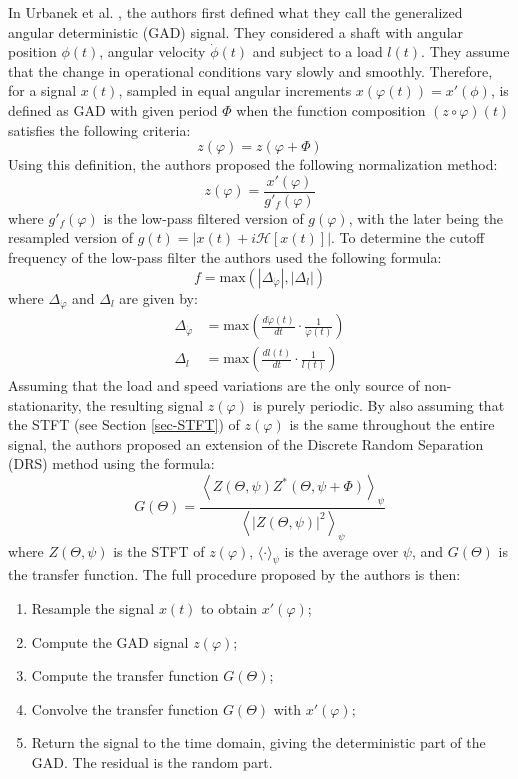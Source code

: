 In Urbanek et al. \cite{URBANEK201713}, the authors first defined what they call the generalized angular deterministic (GAD) signal. They considered a shaft with angular position $\phi(t)$, angular velocity $\dot{\phi}(t)$ and subject to a load $l(t)$. They assume that the change in operational conditions vary slowly and smoothly. Therefore, for a signal $x(t)$, sampled in equal angular increments $x(\varphi(t)) = x'(\phi)$, is defined as GAD with given period $\Phi$ when the function composition $(z \circ \varphi)(t)$ satisfies the following criteria:
\begin{equation}
    z(\varphi) = z(\varphi + \Phi)
\end{equation}
Using this definition, the authors proposed the following normalization method:
\begin{equation}
    z(\varphi) = \frac{x'(\varphi)}{g'_f(\varphi)}
\end{equation}
where $g'_f(\varphi)$ is the low-pass filtered version of $g(\varphi)$, with the later being the resampled version of $g(t) = |x(t)+i\mathcal{H}[x(t)]|$. To determine the cutoff frequency of the low-pass filter the authors used the following formula:
\begin{equation}
    f = \text{max}\left(|\Delta_{\dot{\varphi}}|, |\Delta_{l}|\right)
\end{equation}
where $\Delta_{\dot{\varphi}}$ and $\Delta_{l}$ are given by:
\begin{align}
    \Delta_{\dot{\varphi}} &= \text{max}\left(\frac{d\dot{\varphi}(t)}{dt} \cdot \frac{1}{\dot{\varphi}(t)}\right) \\
    \Delta_{l} &= \text{max}\left(\frac{dl(t)}{dt} \cdot \frac{1}{l(t)}\right)
\end{align}
Assuming that the load and speed variations are the only source of non-stationarity, the resulting signal $z(\varphi)$ is purely periodic. By also assuming that the STFT (see Section \ref{sec-STFT}) of $z(\varphi)$ is the same throughout the entire signal, the authors proposed an extension of the Discrete Random Separation (DRS) \cite{ANTONI20051166} method using the formula:
\begin{equation}
    G(\Theta) = \frac{\left \langle Z(\Theta, \psi)Z^*(\Theta, \psi + \Phi) \right \rangle_\psi}{\left \langle |Z(\Theta, \psi)|^2 \right \rangle_\psi}
\end{equation}
where $Z(\Theta, \psi)$ is the STFT of $z(\varphi)$, $\langle \cdot \rangle_\psi$ is the average over $\psi$, and $G(\Theta)$ is the transfer function. The full procedure proposed by the authors is then:
\begin{enumerate}
    \item Resample the signal $x(t)$ to obtain $x'(\varphi)$;
    \item Compute the GAD signal $z(\varphi)$;
    \item Compute the transfer function $G(\Theta)$;
    \item Convolve the transfer function $G(\Theta)$ with $x'(\varphi)$;
    \item Return the signal to the time domain, giving the deterministic part of the GAD. The residual is the random part.
\end{enumerate}

